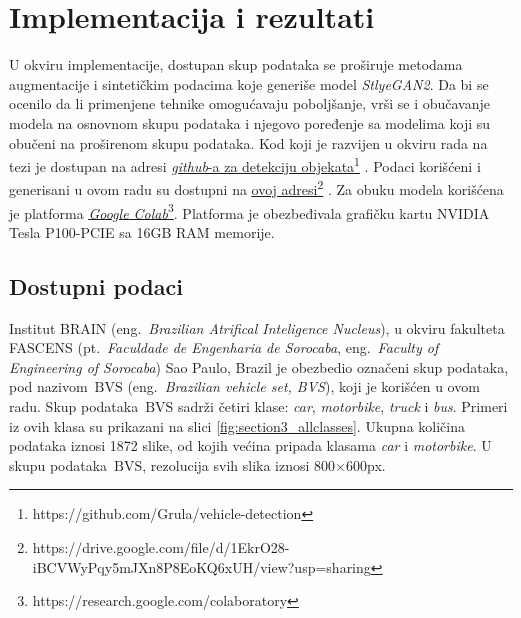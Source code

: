 \documentclass[12pt,oneside]{memoir}
\newcommand{\bvs}{\ensuremath{\,\textrm{BVS}}}
\begin{document}

\chapter{Implementacija i rezultati}
\label{section5}

U okviru implementacije, dostupan skup podataka se proširuje metodama augmentacije i sintetičkim podacima koje generiše model \textit{StlyeGAN2}.
Da bi se ocenilo da li primenjene tehnike omogućavaju poboljšanje, vrši se i obučavanje modela na osnovnom skupu podataka i njegovo poređenje sa modelima koji su obučeni na proširenom skupu podataka.
Kod koji je razvijen u okviru rada na tezi je dostupan na adresi  \underline{\href{https://github.com/Grula/vehicle-detection}{\textit{github}-a za detekciju objekata}}\footnote{https://github.com/Grula/vehicle-detection} \cite{vehicleGit2022}. Podaci korišćeni i generisani u ovom radu su dostupni na \href{https://drive.google.com/file/d/1EkrO28-iBCVWyPqy5mJXn8P8EoKQ6xUH/view?usp=sharing}{\underline{ovoj adresi}}\footnote{https://drive.google.com/file/d/1EkrO28-iBCVWyPqy5mJXn8P8EoKQ6xUH/view?usp=sharing} \cite{vehicleData2022}. Za obuku modela korišćena je platforma \href{https://research.google.com/colaboratory/}{\underline{\textit{Google Colab}}}\footnote{https://research.google.com/colaboratory}. Platforma je obezbeđivala grafičku kartu NVIDIA Tesla P100-PCIE sa 16GB RAM memorije. 


\section{Dostupni podaci}

Institut BRAIN (eng.~\textit{Brazilian Atrifical Inteligence Nucleus}), u okviru fakulteta FASCENS (pt.~\textit{Faculdade de Engenharia de Sorocaba}, eng.~\textit{Faculty of Engineering of Sorocaba}) Sao Paulo, Brazil je obezbedio označeni skup podataka, pod nazivom \bvs{} (eng.~\textit{Brazilian vehicle set, BVS}), koji je korišćen u ovom radu. Skup podataka \bvs{} sadrži četiri klase: \textit{car}, \textit{motorbike}, \textit{truck} i \textit{bus}. Primeri iz ovih klasa su prikazani na slici \ref{fig:section3_allclasses}. Ukupna količina podataka iznosi 1872 slike, od kojih većina pripada klasama \textit{car} i \textit{motorbike}. U skupu podataka \bvs, rezolucija svih slika iznosi 800$\times$600px. 
\end{document}
